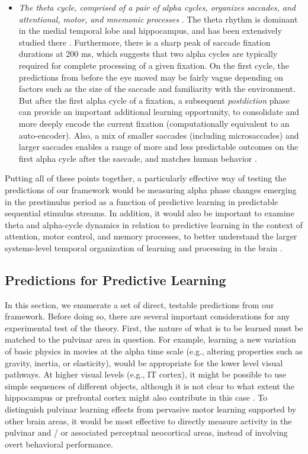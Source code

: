 \documentclass[11pt,twoside]{article}
\newif\myifpdf
\begin{document}
\begin{itemize}
	\item \emph{The theta cycle, comprised of a pair of alpha cycles, organizes saccades, and attentional, motor, and mnemonic processes} \citep{FiebelkornKastner19}.  The theta rhythm is dominant in the medial temporal lobe and hippocampus, and has been extensively studied there \citep{KahanaSeeligMadsen01,Buzsaki05}.  Furthermore, there is a  sharp peak of saccade fixation durations at 200 ms, which suggests that two alpha cycles are typically required for  complete processing of a given fixation.  On the first cycle, the predictions from before the eye moved may be fairly vague depending on factors such as the size of the saccade and familiarity with the environment.  But after the first alpha cycle of a fixation, a subsequent \emph{postdiction} phase can provide an important additional learning opportunity, to consolidate and more deeply encode the current fixation (computationally equivalent to an auto-encoder).  Also, a mix of smaller saccades (including microsaccades) and larger saccades enables a range of more and less predictable outcomes on the first alpha cycle after the saccade, and matches human behavior \citep{Martinez-CondeOtero-MillanMacknik13,Martinez-CondeMacknikHubel04}.

\end{itemize}

Putting all of these points together, a particularly effective way of testing the predictions of our framework would be measuring alpha phase changes emerging in the prestimulus period as a function of predictive learning in predictable sequential stimulus streams.  In addition, it would also be important to examine theta and alpha-cycle dynamics in relation to predictive learning in the context of attention, motor control, and memory processes, to better understand the larger systems-level temporal organization of learning and processing in the brain \citep{FiebelkornKastner19}.

\subsection{Predictions for Predictive Learning}

In this section, we enumerate a set of direct, testable predictions from our framework.  Before doing so, there are several important considerations for any experimental test of the theory.  First, the nature of what is to be learned must be matched to the pulvinar area in question.  For example, learning a new variation of basic physics in movies at the alpha time scale (e.g., altering properties such as gravity, inertia, or elasticity), would be appropriate for the lower level visual pathways.  At higher visual levels (e.g., IT cortex), it might be possible to use simple sequences of different objects, although it is not clear to what extent the hippocampus or prefrontal cortex might also contribute in this case \citep{GavornikBear14,FiserMahringerOyiboEtAl16}.  To distinguish pulvinar learning effects from pervasive motor learning supported by other brain areas, it would be most effective to directly measure activity in the pulvinar and / or associated perceptual neocortical areas, instead of involving overt behavioral performance.
\end{document}
